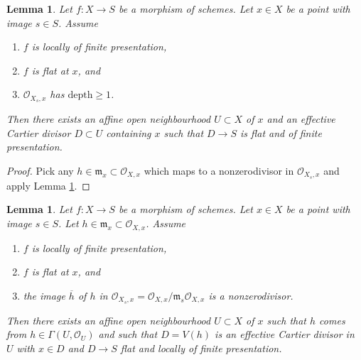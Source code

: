 \documentclass{amsart}
\theoremstyle{plain}
\newtheorem{lemma}[subsection]{Lemma}
\theoremstyle{definition}
\theoremstyle{remark}
\numberwithin{equation}{subsection}
\begin{document}
\begin{lemma}
\label{more-morphisms-lemma-slice-once}
Let $f : X \to S$ be a morphism of schemes.
Let $x \in X$ be a point with image $s \in S$.
Assume
\begin{enumerate}
\item $f$ is locally of finite presentation,
\item $f$ is flat at $x$, and
\item $\mathcal{O}_{X_s, x}$ has $\text{depth} \geq 1$.
\end{enumerate}
Then there exists an affine open neighbourhood $U \subset X$ of $x$
and an effective Cartier divisor $D \subset U$ containing $x$ such that
$D \to S$ is flat and of finite presentation.
\end{lemma}

\begin{proof}
Pick any $h \in \mathfrak m_x \subset \mathcal{O}_{X, x}$ which
maps to a nonzerodivisor in $\mathcal{O}_{X_s, x}$ and apply
Lemma \ref{more-morphisms-lemma-slice-given-element}.
\end{proof}


\begin{lemma}
\label{more-morphisms-lemma-slice-given-element}
Let $f : X \to S$ be a morphism of schemes.
Let $x \in X$ be a point with image $s \in S$.
Let $h \in \mathfrak m_x \subset \mathcal{O}_{X, x}$.
Assume
\begin{enumerate}
\item $f$ is locally of finite presentation,
\item $f$ is flat at $x$, and
\item the image $\overline{h}$ of $h$ in
$\mathcal{O}_{X_s, x} = \mathcal{O}_{X, x}/\mathfrak m_s\mathcal{O}_{X, x}$
is a nonzerodivisor.
\end{enumerate}
Then there exists an affine open neighbourhood $U \subset X$ of $x$
such that $h$ comes from $h \in \Gamma(U, \mathcal{O}_U)$ and such
that $D = V(h)$ is an effective Cartier divisor in $U$ with $x \in D$ and
$D \to S$ flat and locally of finite presentation.
\end{lemma}
\end{document}
